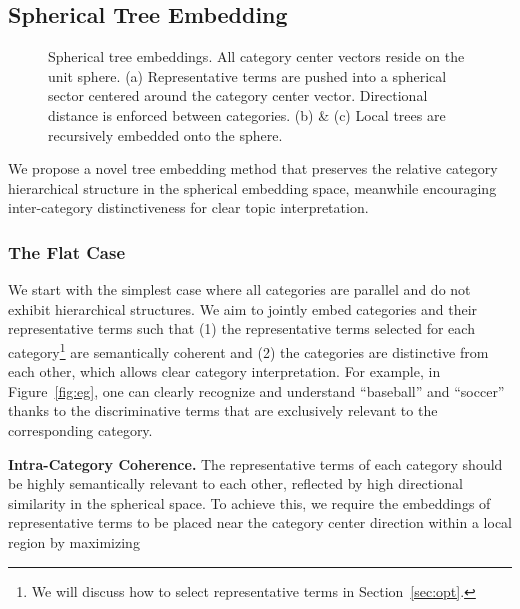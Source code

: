 \documentclass[sigconf]{acmart}
\theoremstyle{definition}
\begin{document}
\subsection{Spherical Tree Embedding}
\begin{figure*}[ht]
\caption{Spherical tree embeddings. All category center vectors reside on the unit sphere. (a) Representative terms are pushed into a spherical sector centered around the category center vector. Directional distance is enforced between categories. (b) \& (c) Local trees are recursively embedded onto the sphere.}
\label{fig:sphere}
\end{figure*}
We propose a novel tree embedding method that preserves the relative category hierarchical structure in the spherical embedding space, meanwhile encouraging inter-category distinctiveness for clear topic interpretation.

\subsubsection{The Flat Case}

We start with the simplest case where all categories are parallel and do not exhibit hierarchical structures. We aim to jointly embed categories and their representative terms such that (1) the representative terms selected for each category\footnote{We will discuss how to select representative terms in Section~\ref{sec:opt}.} are semantically coherent and (2) the categories are distinctive from each other, which allows clear category interpretation. For example, in Figure~\ref{fig:eg}, one can clearly recognize and understand ``baseball'' and ``soccer'' thanks to the discriminative terms that are exclusively relevant to the corresponding category.

\noindent
\textbf{Intra-Category Coherence.} 
The representative terms of each category should be highly semantically relevant to each other, reflected by high directional similarity in the spherical space. To achieve this, we require the embeddings of representative terms to be placed near the category center direction within a local region by maximizing
\end{document}
